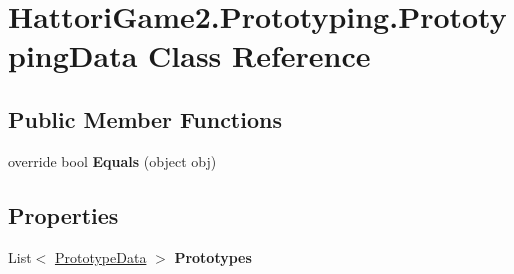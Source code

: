 \hypertarget{class_hattori_game2_1_1_prototyping_1_1_prototyping_data}{}\section{Hattori\+Game2.\+Prototyping.\+Prototyping\+Data Class Reference}
\label{class_hattori_game2_1_1_prototyping_1_1_prototyping_data}
\subsection*{Public Member Functions}
\begin{DoxyCompactItemize}
\item 
\hypertarget{class_hattori_game2_1_1_prototyping_1_1_prototyping_data_aae362771016bb6e402bbf72ae26a3ca3}{}override bool {\bfseries Equals} (object obj)\label{class_hattori_game2_1_1_prototyping_1_1_prototyping_data_aae362771016bb6e402bbf72ae26a3ca3}

\end{DoxyCompactItemize}
\subsection*{Properties}
\begin{DoxyCompactItemize}
\item 
\hypertarget{class_hattori_game2_1_1_prototyping_1_1_prototyping_data_a8c52795f1380fa8146143e8cc40d16d5}{}List$<$ \hyperlink{class_hattori_game2_1_1_prototyping_1_1_prototype_data}{Prototype\+Data} $>$ {\bfseries Prototypes}\label{class_hattori_game2_1_1_prototyping_1_1_prototyping_data_a8c52795f1380fa8146143e8cc40d16d5}

\end{DoxyCompactItemize}
